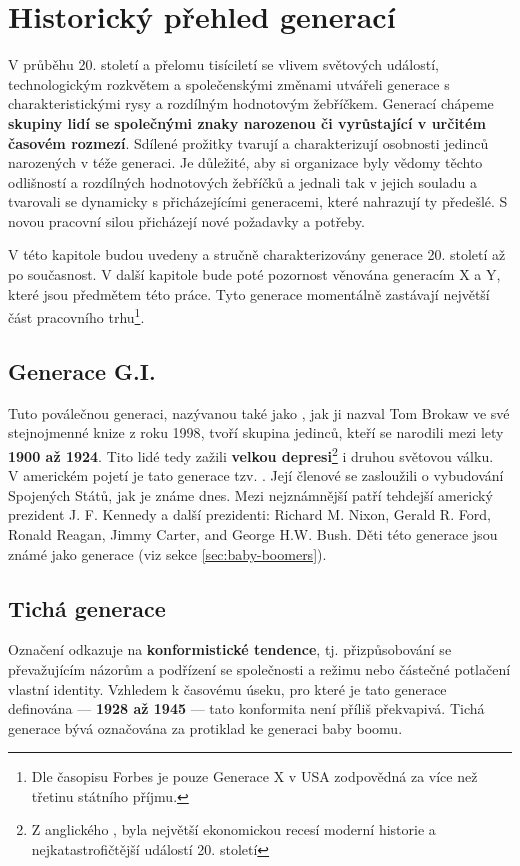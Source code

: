 \chapter{Historický přehled generací}

V průběhu 20. století a přelomu tisíciletí se vlivem světových událostí, technologickým rozkvětem a společenskými změnami utvářeli generace s charakteristickými rysy a rozdílným hodnotovým žebříčkem. Generací chápeme \textbf{skupiny lidí se společnými znaky narozenou či vyrůstající v určitém časovém rozmezí}. Sdílené prožitky tvarují a charakterizují osobnosti jedinců narozených v téže generaci.
Je důležité, aby si organizace byly vědomy těchto odlišností a rozdílných hodnotových žebříčků a jednali tak v jejich souladu a tvarovali se dynamicky s přicházejícími generacemi, které nahrazují ty předešlé. S novou pracovní silou přicházejí nové požadavky a potřeby.

V této kapitole budou uvedeny a stručně charakterizovány generace 20. století až po současnost. V další kapitole bude poté pozornost věnována generacím X a Y, které jsou předmětem této práce. Tyto generace momentálně zastávají největší část pracovního trhu\footnote{Dle časopisu Forbes je pouze Generace X v USA zodpovědná za více než třetinu státního příjmu.\cite{forbes2019generationX}}.

\section{Generace G.I.}
Tuto poválečnou generaci, nazývanou také jako , jak ji nazval Tom Brokaw ve své stejnojmenné knize z roku 1998\cite{cnn2013americangenerationfacts}, tvoří skupina jedinců, kteří se narodili mezi lety \textbf{1900 až 1924}. Tito lidé tedy zažili \textbf{velkou depresi}\footnote{Z anglického \textit{}, byla největší ekonomickou recesí moderní historie a nejkatastrofičtější událostí 20. století\cite{investopedia2019thegreatdepression}} i druhou světovou válku.\\
V americkém pojetí je tato generace tzv. . Její členové se zasloužili o vybudování Spojených Států, jak je známe dnes. Mezi nejznámnější patří tehdejší americký prezident J. F. Kennedy a další prezidenti: Richard M. Nixon, Gerald R. Ford, Ronald Reagan, Jimmy Carter, and George H.W. Bush. Děti této generace jsou známé jako generace  (viz sekce \ref{sec:baby-boomers}).

\section{Tichá generace}
Označení  odkazuje na \textbf{konformistické tendence}\cite{bergh2012coolznacky}, tj. přizpůsobování se převažujícím názorům a podřízení se společnosti a režimu nebo částečné potlačení vlastní identity. Vzhledem k časovému úseku, pro které je tato generace definována --- \textbf{1928 až 1945} --- tato konformita není příliš překvapivá. Tichá generace bývá označována za protiklad ke generaci baby boomu.


